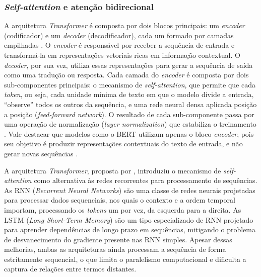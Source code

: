 \documentclass[
    12pt,                %
    openright,           %
    oneside,             %
    a4paper,             %
    english,             %
    brazil               %
]{abntex2}
\begin{document}
\subsubsection{\textit{Self-attention} e atenção bidirecional}
\label{subsubsec:bert_attention}

A arquitetura \textit{Transformer} é composta por dois blocos principais: 
um \textit{encoder} (codificador) e um \textit{decoder} (decodificador), 
cada um formado por camadas empilhadas \cite{vaswani2017}. O \textit{encoder} 
é responsável por receber a sequência de entrada e transformá-la em 
representações vetoriais ricas em informação contextual. O \textit{decoder}, 
por sua vez, utiliza essas representações para gerar a sequência de saída como uma tradução ou resposta. Cada camada do \textit{encoder} é composta 
por dois sub-componentes principais: o mecanismo de \textit{self-attention}, 
que permite que cada \textit{token}, ou seja, cada unidade mínima de texto em que 
o modelo divide a entrada, ``observe'' todos os outros da sequência, 
e uma rede neural densa aplicada posição a posição (\textit{feed-forward 
network}). O resultado de cada sub-componente passa por uma operação de 
normalização (\textit{layer normalization}) que estabiliza o treinamento 
\cite{vaswani2017}. Vale destacar que modelos como o BERT utilizam apenas 
o bloco \textit{encoder}, pois seu objetivo é produzir representações 
contextuais do texto de entrada, e não gerar novas sequências \cite{devlin2019}.

A arquitetura \textit{Transformer}, proposta por , 
introduziu o mecanismo de \textit{self-attention} como alternativa às redes 
recorrentes para processamento de sequências. As RNN (\textit{Recurrent Neural 
Networks}) são uma classe de redes neurais 
projetadas para processar dados sequenciais, nos quais o contexto e a ordem 
temporal importam, processando os \textit{tokens} um por vez, da esquerda para 
a direita. As LSTM (\textit{Long Short-Term Memory}) são um tipo especializado 
de RNN projetado para aprender dependências de longo prazo em sequências, 
mitigando o problema de desvanecimento do gradiente presente nas RNN simples. 
Apesar dessas melhorias, ambas as arquiteturas ainda processam a sequência de 
forma estritamente sequencial, o que limita o paralelismo computacional e 
dificulta a captura de relações entre termos distantes.
\end{document}
